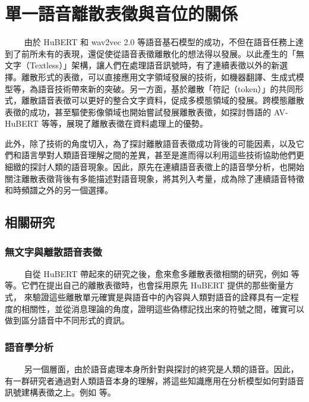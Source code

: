 
\chapter{單一語音離散表徵與音位的關係}  %
　　
由於 HuBERT 和 wav2vec 2.0 等語音基石模型的成功，不但在語音任務上達到了前所未有的表現，還促使從語音表徵離散化的想法得以發展。以此產生的「無文字（Textless）」架構，讓人們在處理語音訊號時，有了連續表徵以外的新選擇。離散形式的表徵，可以直接應用文字領域發展的技術，如機器翻譯、生成式模型等，為語音技術帶來新的突破。另一方面，基於離散「符記（token）」的共同形式，離散語音表徵可以更好的整合文字資料，促成多模態領域的發展。跨模態離散表徵的成功，甚至驅使影像領域也開始嘗試發展離散表徵，如探討唇語的 AV-HuBERT \cite{shi2021learning} 等等，展現了離散表徵在資料處理上的優勢。  %

此外，除了技術的角度切入，為了探討離散語音表徵成功背後的可能因素，以及它們和語言學對人類語音理解之間的差異，甚至是進而得以利用這些技術協助他們更細緻的探討人類的語音現象。因此，原先在連續語音表徵上的語音學分析，也開始關注離散表徵背後有多能描述對語音現象，將其列入考量，成為除了連續語音特徵和時頻譜之外的另一個選擇。

\section{相關研究}

\subsection{無文字與離散語音表徵}
　　
自從 HuBERT 帶起來的研究之後，愈來愈多離散表徵相關的研究，例如  等等。它們在提出自己的離散表徵時，也會採用原先 HuBERT 提供的那些衡量方式，
來驗證這些離散單元確實是與語音中的內容與人類對語音的詮釋具有一定程度的相關性，並從消息理論的角度，證明這些偽標記找出來的符號之間，確實可以做到區分語音中不同形式的資訊。

\subsection{語音學分析}
　　
另一個層面，由於語音處理本身所針對與探討的終究是人類的語音。因此，有一群研究者通過對人類語音本身的理解，將這些知識應用在分析模型如何對語音訊號建構表徵之上。例如  等。

